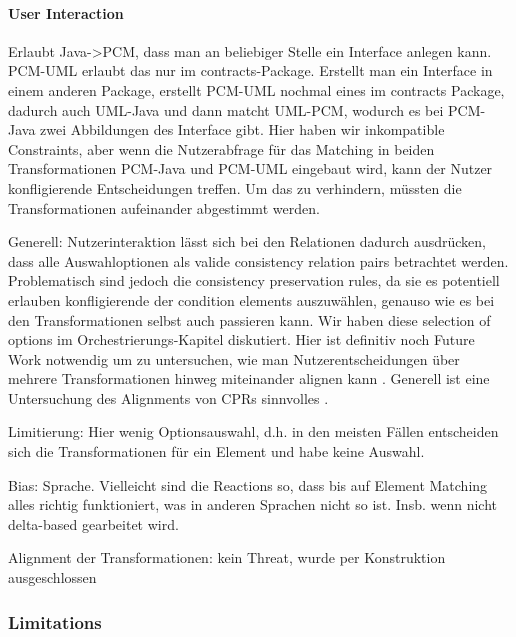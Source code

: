 \paragraph{User Interaction}
Erlaubt Java->PCM, dass man an beliebiger Stelle ein Interface anlegen kann. PCM-UML erlaubt das nur im contracts-Package. Erstellt man ein Interface in einem anderen Package, erstellt PCM-UML nochmal eines im contracts Package, dadurch auch UML-Java und dann matcht UML-PCM, wodurch es bei PCM-Java zwei Abbildungen des Interface gibt. Hier haben wir inkompatible Constraints, aber wenn die Nutzerabfrage für das Matching in beiden Transformationen PCM-Java und PCM-UML eingebaut wird, kann der Nutzer konfligierende Entscheidungen treffen. Um das zu verhindern, müssten die Transformationen aufeinander abgestimmt werden.

Generell: Nutzerinteraktion lässt sich bei den Relationen dadurch ausdrücken, dass alle Auswahloptionen als valide consistency relation pairs betrachtet werden.
Problematisch sind jedoch die consistency preservation rules, da sie es potentiell erlauben konfligierende der condition elements auszuwählen, genauso wie es bei den Transformationen selbst auch passieren kann.
Wir haben diese selection of options im Orchestrierungs-Kapitel diskutiert.
Hier ist definitiv noch Future Work notwendig um zu untersuchen, wie man Nutzerentscheidungen über mehrere Transformationen hinweg miteinander alignen kann .
Generell ist eine Untersuchung des Alignments von CPRs sinnvolles .


Limitierung: Hier wenig Optionsauswahl, d.h. in den meisten Fällen entscheiden sich die Transformationen für ein Element und habe keine Auswahl.

Bias: Sprache. Vielleicht sind die Reactions so, dass bis auf Element Matching alles richtig funktioniert, was in anderen Sprachen nicht so ist. Insb. wenn nicht delta-based gearbeitet wird.

Alignment der Transformationen: kein Threat, wurde per Konstruktion ausgeschlossen


\subsubsection{Limitations}
